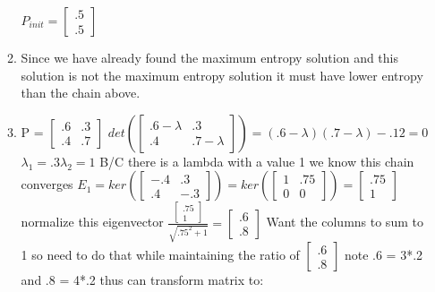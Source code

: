 \documentclass{article}
\begin{document}
\begin{enumerate}
\begin{enumerate}
				$P_{init} = \begin{bmatrix}
				.5 \\
				.5
				\end{bmatrix}$
			\item
				Since we have already found the maximum entropy solution and this solution is not the maximum entropy solution it must have lower entropy than the chain above. 
			\item
				P = $\begin{bmatrix}
				.6 & .3 \\
				.4 & .7 
				\end{bmatrix}$ \newline
				$det ( \begin{bmatrix}
				.6 - \lambda & .3 \\
				.4 & .7 - \lambda
				\end{bmatrix} ) = (.6 - \lambda )(.7 - \lambda) - .12 = 0$ \newline
				$ \lambda_{1} = .3 \lambda_{2} = 1$ \newline
				B/C there is a lambda with a value 1 we know this chain converges \newline
				$E_{1} = ker(\begin{bmatrix}
				-.4 & .3 \\
				.4 & -.3 
				\end{bmatrix} ) = ker( \begin{bmatrix}
				1 & .75 \\
				0 & 0 
				\end{bmatrix} ) = \begin{bmatrix}
				.75 \\
				1
				\end{bmatrix}$ \newline
				normalize this eigenvector
				$ \frac{\begin{bmatrix}
					.75 \\
					1
					\end{bmatrix}}{\sqrt{.75^{2}+1}} = \begin{bmatrix}
				.6 \\
				.8
				\end{bmatrix} $ \newline
				Want the columns to sum to 1 so need to do that while maintaining the ratio of $\begin{bmatrix}
					.6 \\
					.8
				\end{bmatrix}$ note .6 = 3*.2 and .8 = 4*.2 thus can transform matrix to: \newline

\end{enumerate}
\end{enumerate}
\end{document}
